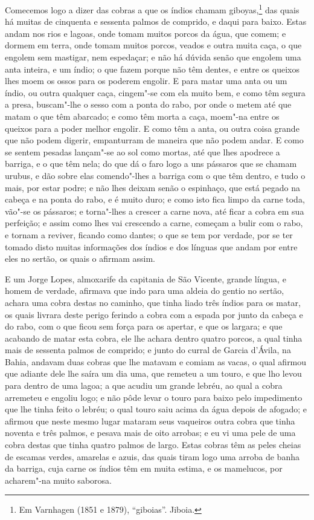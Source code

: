 \begin{linenumbers}
Comecemos logo a dizer das cobras a que os índios chamam giboyas,\footnote{ Em Varnhagen
(1851 e 1879), ``giboias''. Jiboia.} das quais há muitas de cinquenta e sessenta palmos
de comprido, e daqui para baixo. Estas andam nos rios e lagoas, onde tomam muitos porcos
da água, que comem; e dormem em terra, onde tomam muitos porcos, veados e outra muita
caça, o que engolem sem mastigar, nem espedaçar; e não há dúvida senão que engolem uma
anta inteira, e um índio; o que fazem porque não têm dentes, e entre os queixos lhes moem
os ossos para os poderem engolir. E para matar uma anta ou um índio, ou outra qualquer
caça, cingem"-se com ela muito bem, e como têm segura a presa, buscam"-lhe o sesso com a
ponta do rabo, por onde o metem até que matam o que têm abarcado; e como têm morta a caça,
moem"-na entre os queixos para a poder melhor engolir. E como têm a anta, ou outra coisa
grande que não podem digerir, empanturram de maneira que não podem andar. E como se sentem
pesadas lançam"-se ao sol como mortas, até que lhes apodrece a barriga, e o que têm nela;
do que dá o faro logo a uns pássaros que se chamam urubus, e dão sobre elas comendo"-lhes a
barriga com o que têm dentro, e tudo o mais, por estar podre; e não lhes deixam senão o
espinhaço, que está pegado na cabeça e na ponta do rabo, e é muito duro; e como isto fica
limpo da carne toda, vão"-se os pássaros; e torna"-lhes a crescer a carne nova, até ficar a
cobra em sua perfeição; e assim como lhes vai crescendo a carne, começam a bulir com o
rabo, e tornam a reviver, ficando como dantes; o que se tem por verdade, por se ter tomado
disto muitas informações dos índios e dos línguas que andam por entre eles no sertão, os
quais o afirmam assim.

E um Jorge Lopes, almoxarife da capitania de São Vicente, grande língua, e homem de
verdade, afirmava que indo para uma aldeia do gentio no sertão, achara uma cobra destas no
caminho, que tinha liado três índios para os matar, os quais livrara deste perigo ferindo
a cobra com a espada por junto da cabeça e do rabo, com o que ficou sem força para os
apertar, e que os largara; e que acabando de matar esta cobra, ele lhe achara dentro
quatro porcos, a qual tinha mais de sessenta palmos de comprido; e junto do curral de
Garcia d'Ávila, na Bahia, andavam duas cobras que lhe matavam e comiam as vacas, o qual
afirmou que adiante dele lhe saíra um dia uma, que remeteu a um touro, e que lho levou
para dentro de uma lagoa; a que acudiu um grande lebréu, ao qual a cobra arremeteu e
engoliu logo; e não pôde levar o touro para baixo pelo impedimento que lhe tinha feito o
lebréu; o qual touro saiu acima da água depois de afogado; e afirmou que neste mesmo lugar
mataram seus vaqueiros outra cobra que tinha noventa e três palmos, e pesava mais de oito
arrobas; e eu vi uma pele de uma cobra destas que tinha quatro palmos de largo. Estas
cobras têm as peles cheias de escamas verdes, amarelas e azuis, das quais tiram logo uma
arroba de banha da barriga, cuja carne os índios têm em muita estima, e os mamelucos, por
acharem"-na muito saborosa.


\end{linenumbers}
